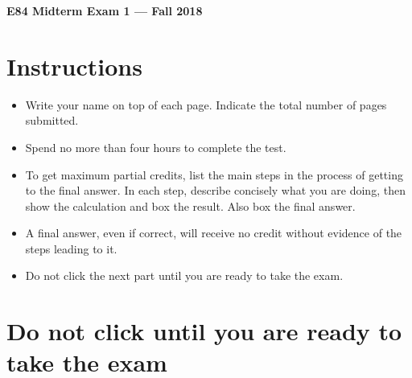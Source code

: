 \usepackage{html}


\begin{center}
{\Large \bf  E84 Midterm Exam 1 --- Fall 2018}
\end{center}

\section*{\bf Instructions}

\begin{itemize}
\item Write your name on top of each page. Indicate the total number
  of pages submitted.
\item Spend no more than four hours to complete the test.
\item To get maximum partial credits, list the main steps in the 
  process of getting to the final answer. In each step, describe 
  concisely what you are doing, then show the calculation and box 
  the result. Also box the final answer.
\item A final answer, even if correct, will receive no credit
  without evidence of the steps leading to it.
\item Do not click the next part until you are ready to take the exam.
\end{itemize}

\newpage

\section*{\bf Do not click until you are ready to take the exam}

